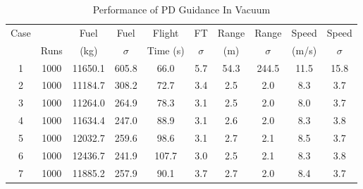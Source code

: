 \begin{table}[ht]                                                                                              
	\centering        
	\caption{Performance of PD Guidance In Vacuum}                                                                 
	\label{tab:disppowvac}                                                                                                                     
	\begin{tabular}{|c|c|c|c|c|c|c|c|c|c|}                                                                         
		\hline                                                                                                        Case &      &   Fuel   &    Fuel   & Flight    &   FT     &  Range    &  Range   & Speed   &   Speed  \\ 
		     & Runs & (kg)     & $\sigma$  &  Time (s) & $\sigma$ &  (m) &    $  \sigma$ & (m/s)   & $\sigma$ \\
		\hline                                                                                                         
		1 & 1000 & 11650.1 & 605.8 & 66.0 & 5.7 & 54.3 & 244.5 & 11.5 & 15.8 \\                                        
		\hline                                                                                                         
		2 & 1000 & 11184.7 & 308.2 & 72.7 & 3.4 & 2.5 & 2.0 & 8.3 & 3.7 \\                                             
		\hline                                                                                                         
		3 & 1000 & 11264.0 & 264.9 & 78.3 & 3.1 & 2.5 & 2.0 & 8.0 & 3.7 \\                                             
		\hline                                                                                                         
		4 & 1000 & 11634.4 & 247.0 & 88.9 & 3.1 & 2.6 & 2.0 & 8.3 & 3.8 \\                                             
		\hline                                                                                                         
		5 & 1000 & 12032.7 & 259.6 & 98.6 & 3.1 & 2.7 & 2.1 & 8.5 & 3.7 \\                                             
		\hline                                                                                                         
		6 & 1000 & 12436.7 & 241.9 & 107.7 & 3.0 & 2.5 & 2.1 & 8.3 & 3.8 \\                                            
		\hline                                                                                                         
		7 & 1000 & 11885.2 & 257.9 & 90.1 & 3.7 & 2.7 & 2.0 & 8.4 & 3.7 \\                                             
		\hline                                                                                                         
	\end{tabular}
\end{table}    

